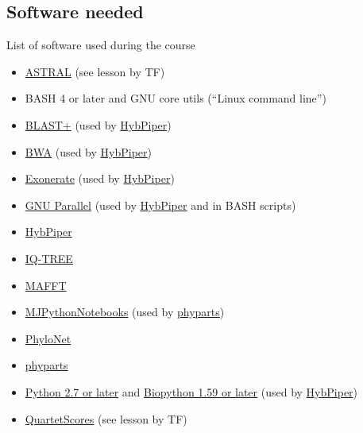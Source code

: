 \documentclass[compress, ucs, xelatex, 11pt, xcolor=x11names, aspectratio=1609,
	hyperref={
		bookmarks=true,
		unicode=true,
		colorlinks=true,
		pdftitle={HybSeq course},
		plainpages=false,
		pdfauthor={Vojtech Zeisek},
		pdfsubject={Practical processing of HybSeq target enrichment sequencing data on computing grids like MetaCentrum},
		pdfcreator={XeLaTeX},
		pdfkeywords={BASH, command line, GNU, HybSeq, Linux, MetaCentrum, sequencing shell, target enrichment},
		linkcolor=Cyan2, %
		anchorcolor=Firebrick2, %
		citecolor=Firebrick2, %
		filecolor=Firebrick2, %
		menucolor=Firebrick2, %
		urlcolor=Chartreuse2, %
		pdftex},
	url={hyphens, lowtilde} %
	]{beamer}
\begin{document}
\subsection{Software needed}

\begin{frame}[allowframebreaks]{List of software used during the course}
	\begin{itemize}
		\item \href{https://github.com/smirarab/ASTRAL}{ASTRAL} (see lesson by TF)
		\item BASH 4 or later and GNU core utils (\enquote{Linux command line})
		\item \href{ftp://ftp.ncbi.nlm.nih.gov/blast/executables/blast+/}{BLAST+} (used by \href{https://github.com/mossmatters/HybPiper/wiki}{HybPiper})
		\item \href{https://github.com/lh3/bwa}{BWA} (used by \href{https://github.com/mossmatters/HybPiper/wiki}{HybPiper})
		\item \href{https://www.ebi.ac.uk/about/vertebrate-genomics/software/exonerate}{Exonerate} (used by \href{https://github.com/mossmatters/HybPiper/wiki}{HybPiper})
		\item \href{https://www.gnu.org/software/parallel/}{GNU Parallel} (used by \href{https://github.com/mossmatters/HybPiper/wiki}{HybPiper} and in BASH scripts)
		\item \href{https://github.com/mossmatters/HybPiper/wiki}{HybPiper}
		\item \href{http://www.iqtree.org/}{IQ-TREE}
		\item \href{https://mafft.cbrc.jp/alignment/software/}{MAFFT}
		\item \href{https://github.com/mossmatters/MJPythonNotebooks}{MJPythonNotebooks} (used by \href{https://bitbucket.org/blackrim/phyparts}{phyparts})
		\item \href{https://bioinfocs.rice.edu/PhyloNet}{PhyloNet}
		\item \href{https://bitbucket.org/blackrim/phyparts}{phyparts}
		\item \href{https://www.python.org/}{Python 2.7 or later} and \href{https://biopython.org/}{Biopython 1.59 or later} (used by \href{https://github.com/mossmatters/HybPiper/wiki}{HybPiper})
		\item \href{https://github.com/lutteropp/QuartetScores}{QuartetScores} (see lesson by TF)

\end{itemize}
\end{frame}
\end{document}
